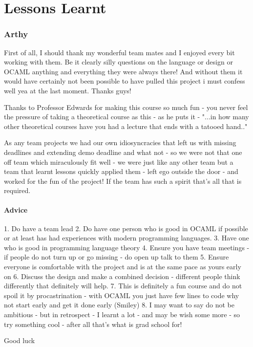\section{Lessons Learnt}
\subsubsection*{Arthy}
First of all, I should thank my wonderful team mates and I enjoyed every bit working with them. Be it clearly silly
questions on the language or design or OCAML anything and everything they were always there! And without them it would
have certainly not been possible to have pulled this project i must confess well yea at the last moment. Thanks guys!

Thanks to Professor Edwards for making this course so much fun - you never feel the pressure of taking a theoretical course as this - as he puts it - "...in how many other theoretical courses have you had a lecture that ends with a tatooed hand.." 

As any team projects we had our own idiosyncracies that left us with missing deadlines and extending demo deadline and what not - so we were not that one off team which miraculously fit well - we were just like any other team but a team that learnt lessons quickly applied them - left ego outside the door - and worked for the fun of the project! If the team has such a spirit that's all that is required.

\paragraph{Advice}
1. Do have a team lead 
2. Do have one person who is good in OCAML if possible or at least has had experiences with modern programming languages.
3. Have one who is good in programming language theory 
4. Ensure you have team meetings - if people do not turn up or go missing - do open up talk to them 
5. Ensure everyone is comfortable with the project and is at the same pace as yours early on
6. Discuss the design and make a combined decision - different people think differently that definitely will help.
7. This is definitely a fun course and do not spoil it by procastrination - with OCAML you just have few lines to 
code why not start early and get it done early (Smiley)
8. I may want to say do not be ambitious - but in retrospect - I learnt a lot - and may be wish some more - so 
try something cool - after all that's what is grad school for!

Good luck

